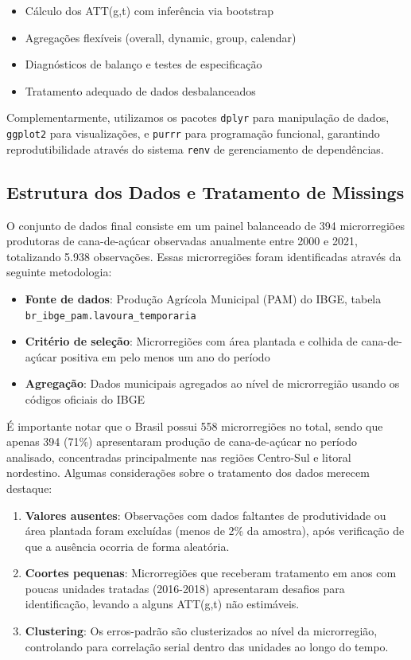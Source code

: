 \documentclass[
	12pt,				%
	openright,			%
	oneside,			%
	a4paper,			%
	english,			%
	french,				%
	spanish,			%
	brazil				%
	]{abntex2}
\begin{document}
\begin{itemize}
\item Cálculo dos ATT(g,t) com inferência via bootstrap
\item Agregações flexíveis (overall, dynamic, group, calendar)
\item Diagnósticos de balanço e testes de especificação
\item Tratamento adequado de dados desbalanceados
\end{itemize}

Complementarmente, utilizamos os pacotes \texttt{dplyr} para manipulação de dados, \texttt{ggplot2} para visualizações, e \texttt{purrr} para programação funcional, garantindo reprodutibilidade através do sistema \texttt{renv} de gerenciamento de dependências.

\subsection{Estrutura dos Dados e Tratamento de Missings}

O conjunto de dados final consiste em um painel balanceado de 394 microrregiões produtoras de cana-de-açúcar observadas anualmente entre 2000 e 2021, totalizando 5.938 observações. Essas microrregiões foram identificadas através da seguinte metodologia:

\begin{itemize}
\item \textbf{Fonte de dados}: Produção Agrícola Municipal (PAM) do IBGE, tabela\\ \texttt{br\_ibge\_pam.lavoura\_temporaria}
\item \textbf{Critério de seleção}: Microrregiões com área plantada e colhida de cana-de-açúcar positiva em pelo menos um ano do período
\item \textbf{Agregação}: Dados municipais agregados ao nível de microrregião usando os códigos oficiais do IBGE
\end{itemize}

É importante notar que o Brasil possui 558 microrregiões no total, sendo que apenas 394 (71\%) apresentaram produção de cana-de-açúcar no período analisado, concentradas principalmente nas regiões Centro-Sul e litoral nordestino. Algumas considerações sobre o tratamento dos dados merecem destaque:

\begin{enumerate}
\item \textbf{Valores ausentes}: Observações com dados faltantes de produtividade ou área plantada foram excluídas (menos de 2\% da amostra), após verificação de que a ausência ocorria de forma aleatória.

\item \textbf{Coortes pequenas}: Microrregiões que receberam tratamento em anos com poucas unidades tratadas (2016-2018) apresentaram desafios para identificação, levando a alguns ATT(g,t) não estimáveis.

\item \textbf{Clustering}: Os erros-padrão são clusterizados ao nível da microrregião, controlando para correlação serial dentro das unidades ao longo do tempo.
\end{enumerate}
\end{document}
